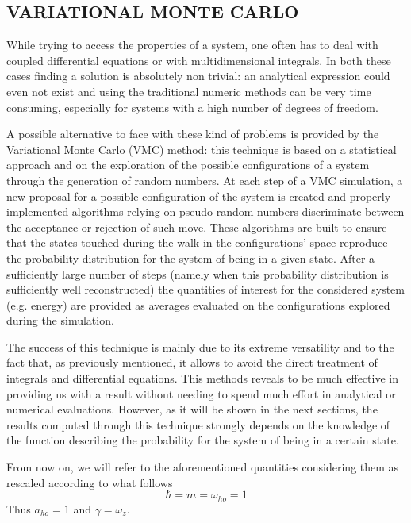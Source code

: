 \subsection{VARIATIONAL MONTE CARLO}
While trying to access the properties of a system, one often has to deal with coupled differential equations or with multidimensional integrals. In both these cases finding a solution is absolutely non trivial: an analytical expression could even not exist and using the traditional numeric methods can be very time consuming, especially for systems with a high number of degrees of freedom.

A possible alternative to face with these kind of problems is provided by the Variational Monte Carlo (VMC) method: this technique is based on a statistical approach and on the exploration of the possible configurations of a system through the generation of random numbers. At each step of a VMC simulation, a new proposal for a possible configuration of the system is created and properly implemented algorithms relying on pseudo-random numbers discriminate between the acceptance or rejection of such move. These algorithms are built to ensure that the states touched during the walk in the configurations' space reproduce the probability distribution for the system of being in a given state. After a sufficiently large number of steps (namely when this probability distribution is sufficiently well reconstructed) the quantities of interest for the considered system (e.g. energy) are provided as averages evaluated on the configurations explored during the simulation. 

The success of this technique is mainly due to its extreme versatility and to the fact that, as previously mentioned, it allows to avoid the direct treatment of integrals and differential equations. This methods reveals to be much effective in providing us with a result without needing to spend much effort in analytical or numerical evaluations. However, as it will be shown in the next sections, the results computed through this technique strongly depends on the knowledge of the function describing the probability for the system of being in a certain state. 

From now on, we will refer to the aforementioned quantities considering them as rescaled according to what follows
\begin{equation*}
    \hbar = m = \omega_{ho} = 1
\end{equation*}
Thus $a_{ho}=1$ and $\gamma = \omega_z$.

